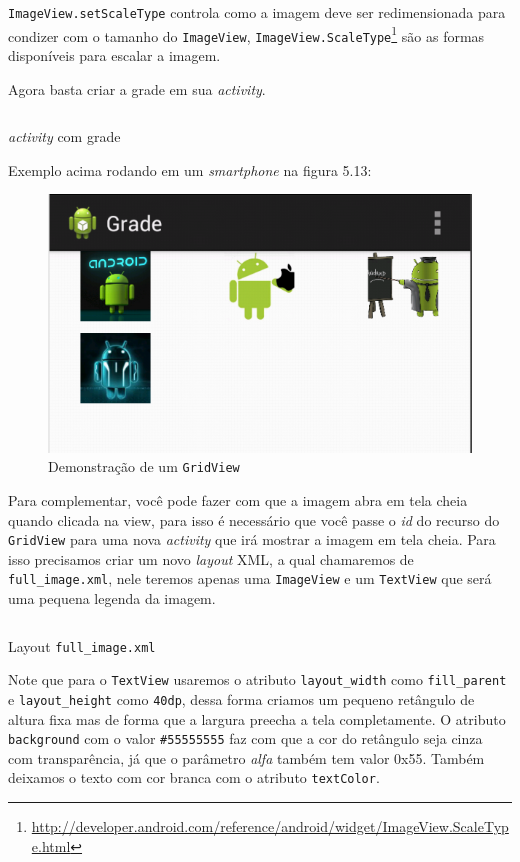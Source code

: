 \documentclass[a4paper,12pt,brazil]{book}
\begin{document}
\begin{singlespace}
  \texttt{ImageView.setScaleType} controla como a imagem deve ser redimensionada para condizer com o tamanho do \texttt{ImageView}, \texttt{ImageView.ScaleType}\footnote{\href{http://developer.android.com/reference/android/widget/ImageView.ScaleType.html}{http://developer.android.com/reference/android/widget/ImageView.ScaleType.html}} são as formas disponíveis para escalar a imagem.

Agora basta criar a grade em sua \emph{activity}.

\begin{listing}[H]
\inputminted[linenos=true,fontsize=\small,frame=lines, framesep=2mm, tabsize=2,numbersep=5pt]{java}{src/design/grade-activity.java}
\caption{\emph{activity} com grade}
\end{listing}	

Exemplo acima rodando em um \emph{smartphone} na figura 5.13:

\begin{figure}[H]
  \centering
  \includegraphics[width=.475\textwidth]{figuras/design/grade-exemplo1.png}
  \caption{Demonstração de um \texttt{GridView}}
  \label{fig:e}
\end{figure}

Para complementar, você pode fazer com que a imagem abra em tela cheia quando clicada na view, para isso é necessário que você passe o \emph{id} do recurso do \texttt{GridView} para uma nova \emph{activity} que irá mostrar a imagem em tela cheia.
Para isso precisamos criar um novo \emph{layout} XML, a qual chamaremos de \texttt{full\_image.xml}, nele teremos apenas uma \texttt{ImageView} e um \texttt{TextView} que será uma pequena legenda da imagem.

\begin{listing}[H]
\inputminted[linenos=true,fontsize=\small,frame=lines, framesep=2mm, tabsize=2,numbersep=5pt]{xml}{src/design/full-image.xml}
\caption{Layout \texttt{full\_image.xml}}
\end{listing}	

Note que para o \texttt{TextView} usaremos o atributo \texttt{layout\_width} como \texttt{fill\_parent} e \texttt{layout\_height} como \texttt{40dp}, dessa forma criamos um pequeno retângulo de altura fixa mas de forma que a largura preecha a tela completamente. O atributo \texttt{background} com o valor \texttt{\#55555555} faz com que a cor do retângulo seja cinza com transparência, já que o parâmetro \emph{alfa} também tem valor 0x55. Também deixamos o texto com cor branca com o atributo \texttt{textColor}.


\end{singlespace}
\end{document}
